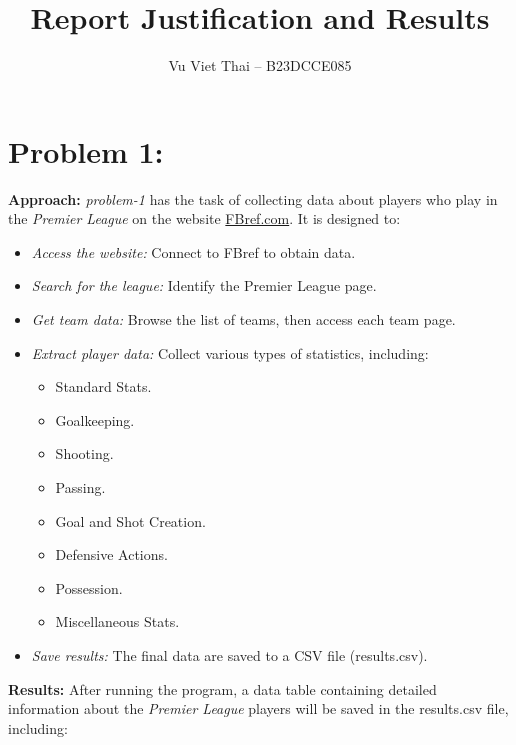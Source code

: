 \documentclass[12pt]{article}
\title{\textbf{Report Justification and Results}}
\author{Vu Viet Thai – B23DCCE085}
\date{}
\begin{document}
\maketitle

\section{Problem 1:}

\textbf{Approach:} \textit{problem-1} has the task of collecting data about players who play in the \textit{Premier League} on the website \href{https://fbref.com/en/}{FBref.com}. It is designed to:

\begin{itemize}
    \item \textit{Access the website:} Connect to FBref to obtain data.
    \item \textit{Search for the league:} Identify the Premier League page.
    \item \textit{Get team data:} Browse the list of teams, then access each team page.
    \item \textit{Extract player data:} Collect various types of statistics, including: 
    
    \begin{itemize}
        \item Standard Stats.
        \item Goalkeeping.
        \item Shooting.
        \item Passing.
        \item Goal and Shot Creation.
        \item Defensive Actions.
        \item Possession.
        \item Miscellaneous Stats.
    \end{itemize}
    
    \item \textit{Save results:} The final data are saved to a CSV file (results.csv).
\end{itemize}

\textbf{Results:} After running the program, a data table containing detailed information about the \textit{Premier League} players will be saved in the results.csv file, including:
\end{document}
